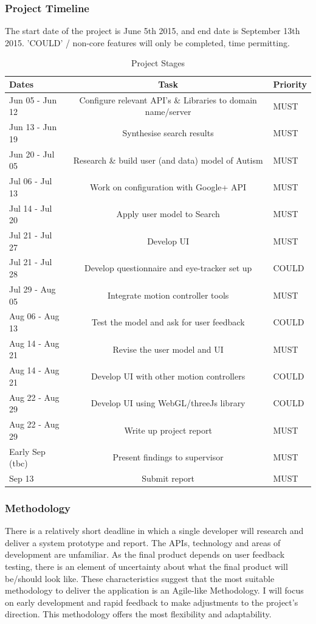 \documentclass[a4paper, 10pt]{article}
\begin{document}
\subsubsection{Project Timeline}
The start date of the project is June 5th 2015, and end date is September 13th 2015. 'COULD' / non-core features will only be completed, time permitting.
\begin{table}[h]
\caption{Project Stages} 
\centering
\begin{tabular}{ L |c| L}
\hline\hline 
Dates & Task & Priority\\ [0.5ex]
\hline 
Jun 05 - Jun 12 & Configure relevant API's \& Libraries to domain name/server & MUST\\
\hline 
Jun 13 - Jun 19 & Synthesise search results & MUST\\
\hline 
Jun 20 - Jul 05 & Research \& build user (and data) model of Autism & MUST\\
\hline 
Jul 06 - Jul 13 & Work on configuration with Google+ API & MUST\\
\hline 
Jul 14 - Jul 20 & Apply user model to Search& MUST\\ 
\hline 
Jul 21 - Jul 27 & Develop UI & MUST\\
\hline 
Jul 21 - Jul 28 & Develop questionnaire and eye-tracker set up & COULD\\
\hline 
Jul 29 - Aug 05 & Integrate motion controller tools& MUST\\
\hline 
Aug 06 - Aug 13 & Test the model and ask for user feedback & COULD\\
\hline 
Aug 14 - Aug 21 & Revise the user model and UI & MUST\\
\hline 
Aug 14 - Aug 21 & Develop UI with other motion controllers & COULD\\
\hline 
Aug 22 - Aug 29 & Develop UI using WebGL/threeJs library & COULD\\
\hline 
Aug 22 - Aug 29 & Write up project report & MUST\\ 
\hline 
Early Sep (tbc) & Present findings to supervisor & MUST\\
\hline 
Sep 13 & Submit report & MUST\\[0.5ex]
\hline
\end{tabular}
\label{stages} 
\end{table}

\subsubsection{Methodology}
There is a relatively short deadline in which a single developer will research and deliver a system prototype and report. The APIs, technology and areas of development are unfamiliar. As the final product depends on user feedback testing, there is an element of uncertainty about what the final product will be/should look like. These characteristics suggest that the most suitable methodology to deliver the application is an Agile-like Methodology. I will focus on early development and rapid feedback to make adjustments to the project's direction. This methodology offers the most flexibility and adaptability.
\end{document}
